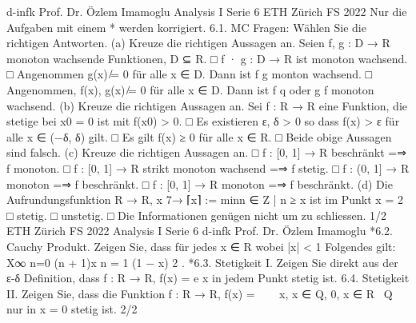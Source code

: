 d-infk
Prof. Dr. Özlem Imamoglu
Analysis I
Serie 6
ETH Zürich
FS 2022
Nur die Aufgaben mit einem * werden korrigiert.
6.1. MC Fragen: Wählen Sie die richtigen Antworten.
(a) Kreuze die richtigen Aussagen an.
Seien f, g : D → R monoton wachsende Funktionen, D ⊆ R.
□ f · g : D → R ist monoton wachsend.
□ Angenommen g(x) ̸= 0 für alle x ∈ D. Dann ist f
g
monton wachsend.
□ Angenommen, f(x), g(x) ̸= 0 für alle x ∈ D. Dann ist f
q
oder g
f monoton
wachsend.
(b) Kreuze die richtigen Aussagen an. Sei f : R → R eine Funktion, die stetige bei
x0 = 0 ist mit f(x0) > 0.
□ Es existieren ε, δ > 0 so dass f(x) > ε für alle x ∈ (−δ, δ) gilt.
□ Es gilt f(x) ≥ 0 für alle x ∈ R.
□ Beide obige Aussagen sind falsch.
(c) Kreuze die richtigen Aussagen an.
□ f : [0, 1] → R beschränkt =⇒ f monoton.
□ f : [0, 1] → R strikt monoton wachsend =⇒ f stetig.
□ f : (0, 1] → R monoton =⇒ f beschränkt.
□ f : [0, 1] → R monoton =⇒ f beschränkt.
(d) Die Aufrundungsfunktion R → R, x 7→ ⌈x⌉ := min{n ∈ Z | n ≥ x} ist im Punkt
x = 2
□ stetig.
□ unstetig.
□ Die Informationen genügen nicht um zu schliessen.
1/2
ETH Zürich
FS 2022
Analysis I
Serie 6
d-infk
Prof. Dr. Özlem Imamoglu
*6.2. Cauchy Produkt. Zeigen Sie, dass für jedes x ∈ R wobei |x| < 1 Folgendes
gilt:
X∞
n=0
(n + 1)x
n =
1
(1 − x)
2
.
*6.3. Stetigkeit I. Zeigen Sie direkt aus der ε-δ Definition, dass
f : R → R, f(x) = e
x
in jedem Punkt stetig ist.
6.4. Stetigkeit II. Zeigen Sie, dass die Funktion
f : R → R, f(x) =



x, x ∈ Q,
0, x ∈ R \ Q
nur in x = 0 stetig ist.
2/2
